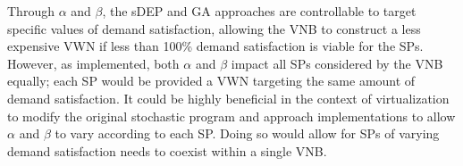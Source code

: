 \documentclass[12pt,dvipsnames]{report}
\begin{document}
Through $\alpha$ and $\beta$, the sDEP and GA approaches are controllable to target specific values of demand satisfaction, allowing the VNB to construct a less expensive VWN if less than 100\% demand satisfaction is viable for the SPs.  However, as implemented, both $\alpha$ and $\beta$ impact all SPs considered by the VNB equally; each SP would be provided a VWN targeting the same amount of demand satisfaction.  It could be highly beneficial in the context of virtualization to modify the original stochastic program and approach implementations to allow $\alpha$ and $\beta$ to vary according to each SP.  Doing so would allow for SPs of varying demand satisfaction needs to coexist within a single VNB.


\end{document}
